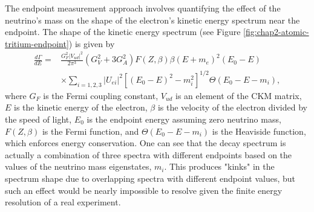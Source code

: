 The endpoint measurement approach involves quantifying the effect of the neutrino's mass on the shape of the electron's kinetic energy spectrum near the endpoint. The shape of the kinetic energy spectrum (see Figure \ref{fig:chap2-atomic-tritium-endpoint}) is given by 
\begin{equation}
\begin{split}
    \frac{d\Gamma}{dE}=&\frac{G_F^2|V_{ud}|^2}{2\pi^3}(G_V^2+3G_A^2)F(Z,\beta)\beta(E+m_e)^2(E_0-E)\\
    &\times \sum_{i=1,2,3}{|U_{ei}|^2[(E_0-E)^2-m_i^2]^{1/2}\Theta(E_0-E-m_i)},
\end{split}
\end{equation}
where $G_F$ is the Fermi coupling constant, $V_{ud}$ is an element of the CKM matrix, $E$ is the kinetic energy of the electron, $\beta$ is the velocity of the electron divided by the speed of light, $E_0$ is the endpoint energy assuming zero neutrino mass, $F(Z,\beta)$ is the Fermi function, and $\Theta(E_0-E-m_i)$ is the Heaviside function, which enforces energy conservation. One can see that the decay spectrum is actually a combination of three spectra with different endpoints based on the values of the neutrino mass eigenstates, $m_i$. This produces "kinks" in the spectrum shape due to overlapping spectra with different endpoint values, but such an effect would be nearly impossible to resolve given the finite energy resolution of a real experiment. 

